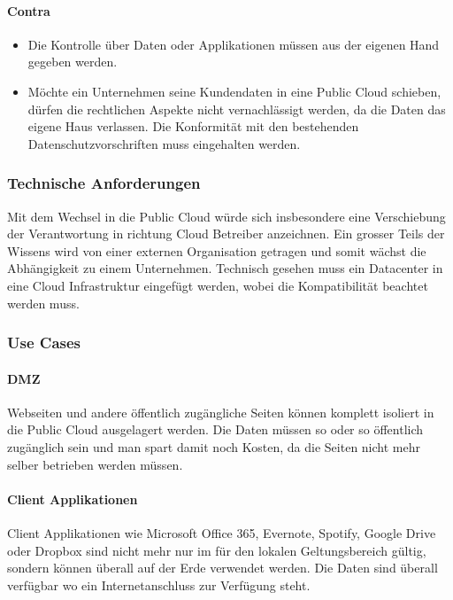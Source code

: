 \paragraph{Contra}
\begin{itemize}
	\item Die Kontrolle über Daten oder Applikationen müssen aus der eigenen Hand gegeben werden. 
	\item Möchte ein Unternehmen seine Kundendaten in eine Public Cloud schieben, dürfen die rechtlichen Aspekte nicht vernachlässigt werden, da die Daten das eigene Haus verlassen. Die Konformität mit den bestehenden Datenschutzvorschriften muss eingehalten werden.
\end{itemize}

\subsubsection{Technische Anforderungen}
Mit dem Wechsel in die Public Cloud würde sich insbesondere eine Verschiebung der Verantwortung in richtung Cloud Betreiber anzeichnen. Ein grosser Teils der Wissens wird von einer externen Organisation getragen und somit wächst die Abhängigkeit zu einem Unternehmen. Technisch gesehen muss ein Datacenter in eine Cloud Infrastruktur eingefügt werden, wobei die Kompatibilität beachtet werden muss. 

\subsubsection{Use Cases}
\paragraph{DMZ} Webseiten und andere öffentlich zugängliche Seiten können komplett isoliert in die Public Cloud ausgelagert werden. Die Daten müssen so oder so öffentlich zugänglich sein und man spart damit noch Kosten, da die Seiten nicht mehr selber betrieben werden müssen.

\paragraph{Client Applikationen}
Client Applikationen wie Microsoft Office 365, Evernote, Spotify, Google Drive oder Dropbox sind nicht mehr nur im für den lokalen Geltungsbereich gültig, sondern können überall auf der Erde verwendet werden. Die Daten sind überall verfügbar wo ein Internetanschluss zur Verfügung steht.

